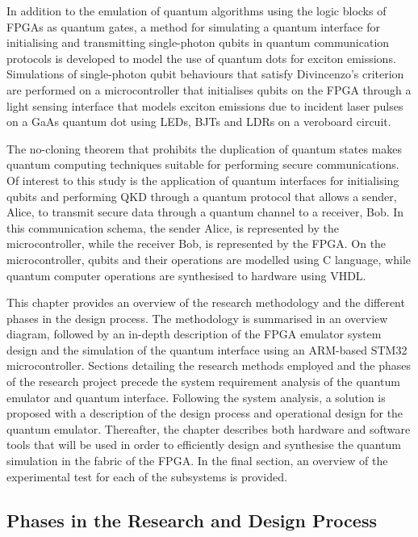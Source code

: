 In addition to the emulation of quantum algorithms using the logic blocks of FPGAs as quantum gates, a method for simulating a quantum interface for initialising and transmitting single-photon qubits in quantum communication protocols is developed to model the use of quantum dots for exciton emissions. Simulations of single-photon qubit behaviours that satisfy Divincenzo's criterion are performed on a microcontroller that initialises qubits on the FPGA through a light sensing interface that models exciton emissions due to incident laser pulses on a GaAs quantum dot using LEDs, BJTs and LDRs on a veroboard circuit. 

The no-cloning theorem that prohibits the duplication of quantum states makes quantum computing techniques suitable for performing secure communications. Of interest to this study is the application of quantum interfaces for initialising qubits and performing QKD through a quantum protocol that allows a sender, Alice, to transmit secure data through a quantum channel to a receiver, Bob. In this communication schema, the sender Alice, is represented by the microcontroller, while the receiver Bob, is represented by the FPGA. On the microcontroller, qubits and their operations are modelled using C language, while quantum computer operations are synthesised to hardware using VHDL. 

This chapter provides an overview of the research methodology and the different phases in the design process. The methodology is summarised in an overview diagram, followed by an in-depth description of the FPGA emulator system design and the simulation of the quantum interface using an ARM-based STM32 microcontroller. Sections detailing the research methods employed and the phases of the research project precede the system requirement analysis of the quantum emulator and quantum interface. Following the system analysis, a solution is proposed with a description of the design process and operational design for the quantum emulator. Thereafter, the chapter describes both hardware and software tools that will be used in order to efficiently design and synthesise the quantum simulation in the fabric of the FPGA. In the final section, an overview of the experimental test for each of the subsystems is provided. 

\subsection{Phases in the Research and Design Process \label{subsec:method-phases}}

